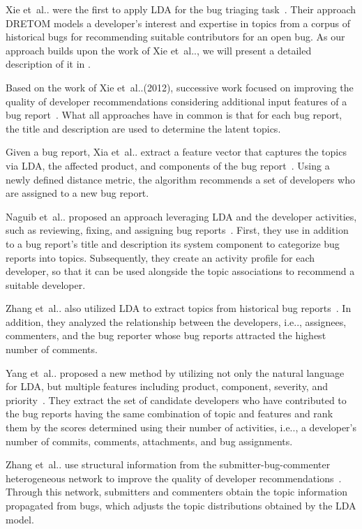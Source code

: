 \documentclass[a4paper,twoside]{article}
\makeatletter
\DeclareRobustCommand\onedot{\futurelet\@let@token\@onedot}
\def\@onedot{\ifx\@let@token.\else.\null\fi\xspace}
\def\etal{et~al\onedot}
\def\ie{i.e\onedot,\xspace}
\makeatother
\begin{document}
Xie \etal were the first to apply \ac{LDA} for the bug triaging task~\cite{xie2012dretom}.
Their approach \ac{DRETOM} models a developer's interest and expertise in topics from a corpus of historical bugs for recommending suitable contributors for an open bug.
As our approach builds upon the work of Xie \etal, we will present a detailed description of it in .

Based on the work of Xie \etal (2012), successive work focused on improving the quality of developer recommendations considering additional input features of a bug report~\cite{xia2013accurate,naguib2013bug,zhang2014novel,yang2014towards,nguyen2014topic,zhang2016towards,xia2016improving,zhang2014butter}.
What all approaches have in common is that for each bug report, the title and description are used to determine the latent topics.

Given a bug report, Xia \etal extract a feature vector that captures the topics via \ac{LDA}, the affected product, and components of the bug report~\cite{xia2013accurate}.
Using a newly defined distance metric, the algorithm recommends a set of developers who are assigned to a new bug report.

Naguib \etal proposed an approach leveraging \ac{LDA} and the developer activities, such as reviewing, fixing, and assigning bug reports~\cite{naguib2013bug}.
First, they use in addition to a bug report's title and description its system component to categorize bug reports into topics.
Subsequently, they create an activity profile for each developer, so that it can be used alongside the topic associations to recommend a suitable developer.

Zhang \etal also utilized \ac{LDA} to extract topics from historical bug reports~\cite{zhang2014novel}.
In addition, they analyzed the relationship between the developers, \ie assignees, commenters, and the bug reporter whose bug reports attracted the highest number of comments.

Yang \etal proposed a new method by utilizing not only the natural language for \ac{LDA}, but multiple features including product, component, severity, and priority~\cite{yang2014towards}.
They extract the set of candidate developers who have contributed to the bug reports having the same combination of topic and features and rank them by the scores determined using their number of activities, \ie a developer's number of commits, comments, attachments, and bug assignments.

Zhang \etal use structural information from the submitter-bug-commenter heterogeneous network to improve the quality of developer recommendations~\cite{zhang2014butter}.
Through this network, submitters and commenters obtain the topic information propagated from bugs, which adjusts the topic distributions obtained by the \ac{LDA} model.
\end{document}
